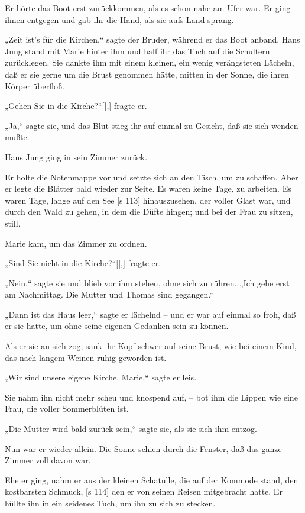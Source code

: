 Er hörte das Boot erst zurückkommen, als es
schon nahe am Ufer war. Er ging ihnen entgegen
und gab ihr die Hand, als sie aufs Land sprang.

„Zeit ist's für die Kirchen,“ sagte der Bruder,
während er das Boot anband. Hans Jung stand mit
Marie hinter ihm und half ihr das Tuch auf die
Schultern zurücklegen. Sie dankte ihm mit einem
kleinen, ein wenig verängsteten Lächeln, daß er sie
gerne um die Brust genommen hätte, mitten in der
Sonne, die ihren Körper überfloß.

„Gehen Sie in die Kirche?“[|,] fragte er.

„Ja,“ sagte sie, und das Blut stieg ihr auf einmal
zu Gesicht, daß sie sich wenden mußte.

Hans Jung ging in sein Zimmer zurück.

Er holte die Notenmappe vor und setzte sich
an den Tisch, um zu schaffen. Aber er legte die
Blätter bald wieder zur Seite. Es waren keine Tage,
zu arbeiten. Es waren Tage, lange auf den See
[s 113]
hinauszusehen, der voller Glast war, und durch den
Wald zu gehen, in dem die Düfte hingen; und bei
der Frau zu sitzen, still.

Marie kam, um das Zimmer zu ordnen.

„Sind Sie nicht in die Kirche?“[|,] fragte er.

„Nein,“ sagte sie und blieb vor ihm stehen,
ohne sich zu rühren. „Ich gehe erst am Nachmittag.
Die Mutter und Thomas sind gegangen.“

„Dann ist das Haus leer,“ sagte er lächelnd –
und er war auf einmal so froh, daß er sie hatte,
um ohne seine eigenen Gedanken sein zu können.

Als er sie an sich zog, sank ihr Kopf schwer
auf seine Brust, wie bei einem Kind, das nach langem
Weinen ruhig geworden ist.

„Wir sind unsere eigene Kirche, Marie,“ sagte
er leis.

Sie nahm ihn nicht mehr scheu und knospend
auf, – bot ihm die Lippen wie eine Frau, die voller
Sommerblüten ist.

„Die Mutter wird bald zurück sein,“ sagte sie,
als sie sich ihm entzog.

Nun war er wieder allein. Die Sonne schien
durch die Fenster, daß das ganze Zimmer voll
davon war.

Ehe er ging, nahm er aus der kleinen Schatulle,
die auf der Kommode stand, den kostbarsten Schmuck,
[s 114]
den er von seinen Reisen mitgebracht hatte. Er hüllte
ihn in ein seidenes Tuch, um ihn zu sich zu stecken.

